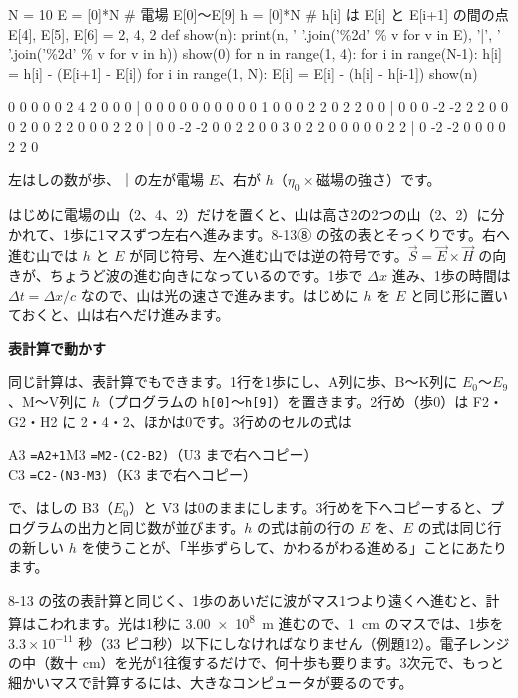 \begin{phcode}[Python]
N = 10
E = [0]*N          \# 電場 E[0]〜E[9]
h = [0]*N          \# h[i] は E[i] と E[i+1] の間の点
E[4], E[5], E[6] = 2, 4, 2
def show(n):
    print(n, ' '.join('\%2d' \% v for v in E), '|',
             ' '.join('\%2d' \% v for v in h))
show(0)
for n in range(1, 4):
    for i in range(N-1):
        h[i] = h[i] - (E[i+1] - E[i])
    for i in range(1, N):
        E[i] = E[i] - (h[i] - h[i-1])
    show(n)
\end{phcode}
\begin{phcodeout}
0  0  0  0  0  2  4  2  0  0  0 |  0  0  0  0  0  0  0  0  0  0
1  0  0  0  2  2  0  2  2  0  0 |  0  0  0 -2 -2  2  2  0  0  0
2  0  0  2  2  0  0  0  2  2  0 |  0  0 -2 -2  0  0  2  2  0  0
3  0  2  2  0  0  0  0  0  2  2 |  0 -2 -2  0  0  0  0  2  2  0
\end{phcodeout}
\noindent 左はしの数が歩、｜の左が電場 $E$、右が $h$（$\eta_0\times$磁場の強さ）です。

はじめに電場の山（2、4、2）だけを置くと、山は高さ2の2つの山（2、2）に分かれて、1歩に1マスずつ左右へ進みます。8-13⑧ の弦の表とそっくりです。右へ進む山では $h$ と $E$ が同じ符号、左へ進む山では逆の符号です。$\vec S=\vec E\times\vec H$ の向きが、ちょうど波の進む向きになっているのです。1歩で $\Delta x$ 進み、1歩の時間は $\Delta t=\Delta x/c$ なので、山は光の速さで進みます。はじめに $h$ を $E$ と同じ形に置いておくと、山は右へだけ進みます。

\noindent\textbf{表計算で動かす}\par\nobreak
同じ計算は、表計算でもできます。1行を1歩にし、A列に歩、B〜K列に $E_0$〜$E_9$、M〜V列に $h$（プログラムの \texttt{h[0]}〜\texttt{h[9]}）を置きます。2行め（歩0）は F2・G2・H2 に 2・4・2、ほかは0です。3行めのセルの式は
\begin{bkcenter}\small
A3 \texttt{=A2+1}\qquad M3 \texttt{=M2-(C2-B2)}（U3 まで右へコピー）\\
C3 \texttt{=C2-(N3-M3)}（K3 まで右へコピー）
\end{bkcenter}
\noindent で、はしの B3（$E_0$）と V3 は0のままにします。3行めを下へコピーすると、プログラムの出力と同じ数が並びます。$h$ の式は前の行の $E$ を、$E$ の式は同じ行の新しい $h$ を使うことが、「半歩ずらして、かわるがわる進める」ことにあたります。

\begin{phyomi}
8-13 の弦の表計算と同じく、1歩のあいだに波がマス1つより遠くへ進むと、計算はこわれます。光は1秒に \qty{3.00e8}{m} 進むので、\qty{1}{cm} のマスでは、1歩を $3.3\times10^{-11}$ 秒（33 ピコ秒）以下にしなければなりません（例題12）。電子レンジの中（数十 cm）を光が1往復するだけで、何十歩も要ります。3次元で、もっと細かいマスで計算するには、大きなコンピュータが要るのです。
\end{phyomi}

